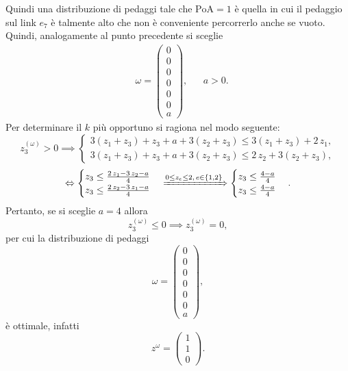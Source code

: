 \begin{alphaparts}
Quindi una distribuzione di pedaggi tale che \(\text{PoA} = 1\) è quella in cui il pedaggio sul link $e_7$ è talmente alto che non è conveniente percorrerlo anche se vuoto. Quindi, analogamente al punto precedente si sceglie 
\begin{align}&\omega =  \begin{pmatrix}
        				0 \\ 0 \\  0 \\ 0 \\ 0 \\ 0 \\ a
    			     \end{pmatrix},&&a>0.\nonumber \end{align}
Per determinare il $k$ più opportuno si ragiona nel modo seguente:
\[ z_{3}^{(\omega)} > 0 \implies \begin{cases} 3\left(z_1 + z_3\right) + z_3 + a +3\left(z_2 + z_3\right) \le 3\left(z_1 + z_3 \right) + 2\,z_1, \\ 3\left(z_1 + z_3\right) + z_3 + a +3\left(z_2 + z_3\right) \le  2\,z_2 + 3\left(z_2 + z_3 \right), \end{cases} \]
\[ \Leftrightarrow \begin{cases} z_3 \le \frac{2\,z_1-3\,z_2-a}{4} \\ z_3 \le \frac{2\,z_2-3\,z_1-a}{4} \end{cases} \xRightarrow[]{0\le z_e \le 2, \, e\in\{1,2\}}\begin{cases} z_3 \le \frac{4-a}{4} \\ z_3 \le \frac{4-a}{4} \end{cases}.\]
Pertanto, se si sceglie $a=4$ allora 
\[z_{3}^{(\omega)} \le 0 \implies  z_{3}^{(\omega)} = 0,\]
per cui la distribuzione di pedaggi 
\[\omega =  \begin{pmatrix}
        				0 \\ 0 \\  0 \\ 0 \\ 0 \\ 0 \\ a
    			     \end{pmatrix},\]
è ottimale, infatti
\[ z^{\omega} = \begin{pmatrix}
        1 \\ 1 \\ 0
    \end{pmatrix}.\]


\end{alphaparts}
